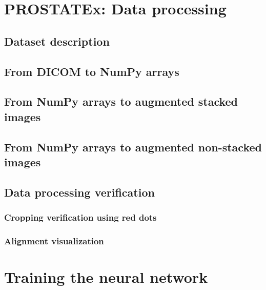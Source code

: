 \section{PROSTATEx: Data processing}
\label{prostatex_data_processing}
\subsection{Dataset description}
\label{prostatex_dataset_description}
\subsection{From DICOM to NumPy arrays}
\subsection{From NumPy arrays to augmented stacked images}
\subsection{From NumPy arrays to augmented non-stacked images}
\subsection{Data processing verification}
\subsubsection{Cropping verification using red dots}
\subsubsection{Alignment visualization}

\section{Training the neural network}
